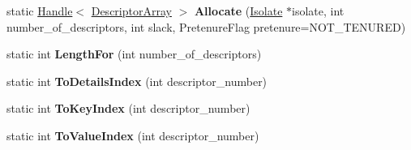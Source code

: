 \begin{DoxyCompactItemize}
\item 
static \hyperlink{classv8_1_1internal_1_1_handle}{Handle}$<$ \hyperlink{classv8_1_1internal_1_1_descriptor_array}{Descriptor\+Array} $>$ {\bfseries Allocate} (\hyperlink{classv8_1_1internal_1_1_isolate}{Isolate} $\ast$isolate, int number\+\_\+of\+\_\+descriptors, int slack, Pretenure\+Flag pretenure=N\+O\+T\+\_\+\+T\+E\+N\+U\+R\+ED)\hypertarget{classv8_1_1internal_1_1_descriptor_array_a7a18f4ce5bd436a5b6010ab0baff542b}{}\label{classv8_1_1internal_1_1_descriptor_array_a7a18f4ce5bd436a5b6010ab0baff542b}

\item 
static int {\bfseries Length\+For} (int number\+\_\+of\+\_\+descriptors)\hypertarget{classv8_1_1internal_1_1_descriptor_array_a181ace210a7829d08ca133afcceb8ea5}{}\label{classv8_1_1internal_1_1_descriptor_array_a181ace210a7829d08ca133afcceb8ea5}

\item 
static int {\bfseries To\+Details\+Index} (int descriptor\+\_\+number)\hypertarget{classv8_1_1internal_1_1_descriptor_array_a971982505e5e9a6fa06f9857bb1bc012}{}\label{classv8_1_1internal_1_1_descriptor_array_a971982505e5e9a6fa06f9857bb1bc012}

\item 
static int {\bfseries To\+Key\+Index} (int descriptor\+\_\+number)\hypertarget{classv8_1_1internal_1_1_descriptor_array_ae321ed31c4de2995fc166fcdf73aea8f}{}\label{classv8_1_1internal_1_1_descriptor_array_ae321ed31c4de2995fc166fcdf73aea8f}

\item 
static int {\bfseries To\+Value\+Index} (int descriptor\+\_\+number)\hypertarget{classv8_1_1internal_1_1_descriptor_array_a659c56dc55f06540eda23abe5c7b952e}{}\label{classv8_1_1internal_1_1_descriptor_array_a659c56dc55f06540eda23abe5c7b952e}

\end{DoxyCompactItemize}
